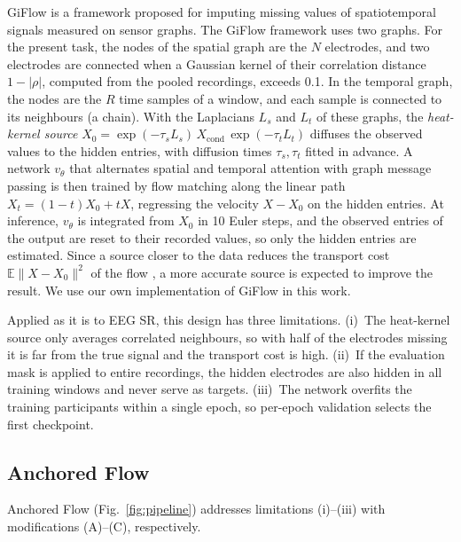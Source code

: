 \documentclass{article}
\begin{document}
GiFlow \cite{zhang2026giflow} is a framework proposed for imputing missing
values of spatiotemporal signals measured on sensor graphs. The GiFlow
framework uses two graphs. For the present task, the nodes of the spatial
graph are the $N$ electrodes, and two electrodes are connected when a
Gaussian kernel of their correlation distance $1-|\rho|$, computed from the
pooled recordings, exceeds 0.1. In the temporal graph, the nodes are the $R$
time samples of a window, and each sample is connected to its neighbours
(a chain). With the Laplacians $L_s$ and $L_t$ of these graphs, the
\emph{heat-kernel source}
$X_0=\exp(-\tau_sL_s)\,X_{\mathrm{cond}}\,\exp(-\tau_tL_t)$ diffuses the
observed values to the hidden entries, with diffusion times
$\tau_s,\tau_t$ fitted in advance. A network $v_\theta$ that alternates
spatial and temporal attention with graph message passing is then trained
by flow matching \cite{lipman2023flow} along the linear path
$X_t=(1-t)X_0+tX$, regressing the velocity $X-X_0$ on the hidden entries.
At inference, $v_\theta$ is integrated from $X_0$ in 10 Euler steps, and
the observed entries of the output are reset to their recorded values, so
only the hidden entries are estimated. Since a source closer to the data
reduces the transport cost $\mathbb{E}\|X-X_0\|^2$ of the flow
\cite{zhang2026giflow}, a more accurate source is expected to improve the
result. We use our own implementation of GiFlow in this work.

Applied as it is to EEG SR, this design has three limitations. (i)~The
heat-kernel source only averages correlated neighbours, so with half of
the electrodes missing it is far from the true signal and the transport
cost is high. (ii)~If the evaluation mask is applied to entire recordings,
the hidden electrodes are also hidden in all training windows and never
serve as targets. (iii)~The network overfits the training participants
within a single epoch, so per-epoch validation selects the first
checkpoint.

\subsection{Anchored Flow}

Anchored Flow (Fig.~\ref{fig:pipeline}) addresses limitations (i)--(iii)
with modifications (A)--(C), respectively.
\end{document}
